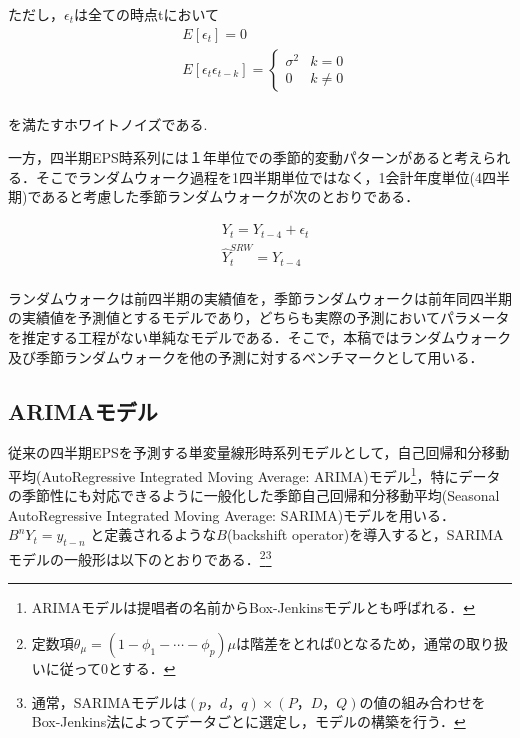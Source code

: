 \documentclass[a4paper，12pt]{jsarticle}
\begin{document}
ただし，$\epsilon_t$は全ての時点tにおいて
\begin{equation}
  \begin{split}
    & E[\epsilon_t] = 0 \\
    & E[\epsilon_t \epsilon_{t-k}] = \left\{
      \begin{array}{ll}
        \sigma^2 & k=0 \\
        0 & k \neq 0
      \end{array}\right.\\
  \end{split}
\end{equation}    

を満たすホワイトノイズである.

一方，四半期EPS時系列には１年単位での季節的変動パターンがあると考えられる．そこでランダムウォーク過程を1四半期単位ではなく，1会計年度単位(4四半期)であると考慮した季節ランダムウォークが次のとおりである．

\begin{equation}
  \begin{split}
    & Y_t = Y_{t-4} + \epsilon_t \\
    & \hat{Y}_t^{SRW} = Y_{t-4} \\
  \end{split}
\end{equation} 

ランダムウォークは前四半期の実績値を，季節ランダムウォークは前年同四半期の実績値を予測値とするモデルであり，どちらも実際の予測においてパラメータを推定する工程がない単純なモデルである．そこで，本稿ではランダムウォーク及び季節ランダムウォークを他の予測に対するベンチマークとして用いる．

\subsection{ARIMAモデル}

従来の四半期EPSを予測する単変量線形時系列モデルとして，自己回帰和分移動平均(AutoRegressive Integrated Moving Average: ARIMA)モデル\citep{box2015time}\footnote{ARIMAモデルは提唱者の名前からBox-Jenkinsモデルとも呼ばれる．}，特にデータの季節性にも対応できるように一般化した季節自己回帰和分移動平均(Seasonal AutoRegressive Integrated Moving Average: SARIMA)モデルを用いる．$B^nY_t = y_{t-n}$ と定義されるような$B$(backshift operator)を導入すると，SARIMAモデルの一般形は以下のとおりである．\footnote{定数項$\theta_{\mu}=(1-\phi_1-\cdots-\phi_p)\mu$は階差をとれば0となるため，通常の取り扱いに従って0とする．}\footnote{通常，SARIMAモデルは$(p，d，q) \times (P，D，Q)$の値の組み合わせをBox-Jenkins法によってデータごとに選定し，モデルの構築を行う．}
\end{document}
